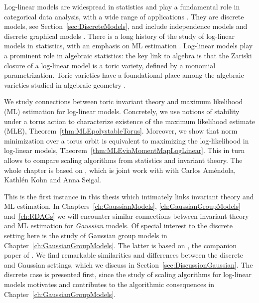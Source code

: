 



Log-linear models are widespread in statistics and play a fundamental role in categorical data analysis, with a wide range of applications \cite{bishop2007discrete}. They are discrete models, see Section~\ref{sec:DiscreteModels}, and include independence models and discrete graphical models \cite{LauritzenBook}. There is a long history of the study of log-linear models in statistics, with an emphasis on ML estimation \cite{MLEloglinear}. Log-linear models play a prominent role in algebraic statistics: the key link to algebra is that the Zariski closure of a log-linear model is a toric variety, defined by a monomial parametrization. Toric varieties have a foundational place among the algebraic varieties studied in algebraic geometry \cite{cox2011toric}.

\medskip

We study connections between toric invariant theory and maximum likelihood (ML) estimation for log-linear models. Concretely, we use notions of stability under a torus action to characterize existence of the maximum likelihood estimate (MLE), Theorem~\ref{thm:MLEpolystableTorus}. Moreover, we show that norm minimization over a torus orbit is equivalent to maximizing the log-likelihood in log-linear models, Theorem~\ref{thm:MLEviaMomentMapLogLinear}. This in turn allows to compare scaling algorithms from statistics and invariant theory.
The whole chapter is based on \cite{DiscretePaper}, which is joint work with with Carlos Am\'endola, Kathl\'en Kohn and Anna Seigal.

\medskip

This is the first instance in this thesis which intimately links invariant theory and ML estimation. In Chapters~\ref{ch:GaussianModels}, \ref{ch:GaussianGroupModels} and~\ref{ch:RDAGs} we will encounter similar connections between invariant theory and ML estimation for \emph{Gaussian} models. Of special interest to the discrete setting here is the study of Gaussian group models in Chapter~\ref{ch:GaussianGroupModels}. The latter is based on \cite{SiagaPaper}, the companion paper of \cite{DiscretePaper}.
We find remarkable similarities and differences between the discrete and Gaussian settings, which we discuss in Section~\ref{sec:DiscussionGaussian}. The discrete case is presented first, since the study of scaling algorithms for log-linear models motivates and contributes to the algorithmic consequences in Chapter~\ref{ch:GaussianGroupModels}. %



